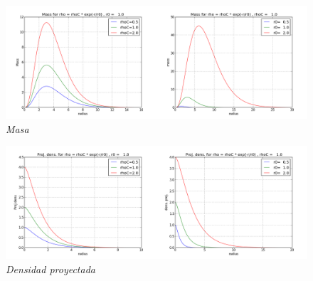 \documentclass[12pt]{book}
\begin{document}
\begin{description}
\item

\begin{figure}[!ht]
 \centering
 \includegraphics[scale=0.33]{massFinal.png}
 \caption{\emph{Masa}}
\end{figure}

\item

\begin{figure}[!ht]
 \centering
 \includegraphics[scale=0.33]{dpFinal.png}
 \caption{\emph{Densidad proyectada}}
\end{figure}
\end{description}


\newpage
\end{document}
